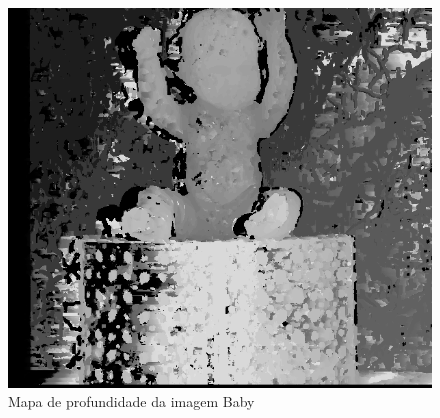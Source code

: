 \begin{figure}[ht!]\label{babyDepth}
\begin{center}
\includegraphics[width= .85\columnwidth]{babyDepth.png}
\caption{Mapa de profundidade da imagem Baby}
\end{center}
\end{figure}